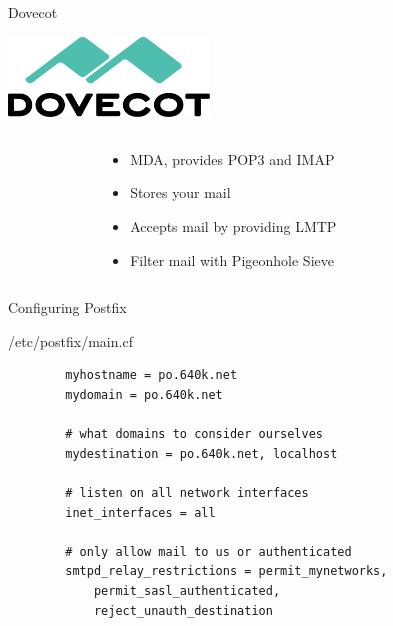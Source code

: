 \documentclass{lug}
\begin{document}
\begin{frame}{Dovecot}
    \begin{center}
        \includegraphics[width=0.4\textwidth]{graphics/dovecot}
    \end{center}
    \begin{columns}
        \begin{column}{0.175\textwidth}
        \end{column}
        \begin{column}{0.65\textwidth}
            \begin{itemize}[<+->]
                \item MDA, provides POP3 and IMAP
                \item Stores your mail
                \item Accepts mail by providing LMTP
                \item Filter mail with Pigeonhole Sieve
            \end{itemize}
        \end{column}
        \begin{column}{0.175\textwidth}
        \end{column}
    \end{columns}
\end{frame}

\begin{frame}[fragile]{Configuring Postfix}
    \begin{block}{\ttfamily /etc/postfix/main.cf}
    \begin{verbatim}
        myhostname = po.640k.net
        mydomain = po.640k.net

        # what domains to consider ourselves
        mydestination = po.640k.net, localhost

        # listen on all network interfaces
        inet_interfaces = all

        # only allow mail to us or authenticated
        smtpd_relay_restrictions = permit_mynetworks,
            permit_sasl_authenticated,
            reject_unauth_destination
    \end{verbatim}
    \end{block}
\end{frame}
\end{document}
